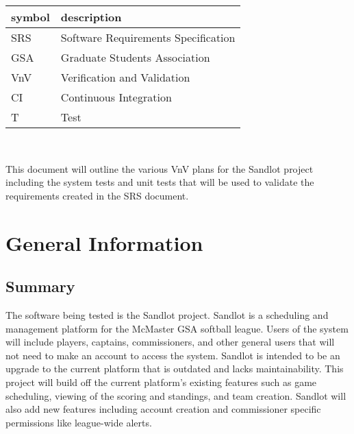 \documentclass[12pt, titlepage]{article}
\begin{document}
\renewcommand{\arraystretch}{1.2}
\begin{tabular}{l l} 
  \toprule		
  \textbf{symbol} & \textbf{description}\\
  \midrule 
  SRS & Software Requirements Specification\\
  GSA & Graduate Students Association\\
  VnV & Verification and Validation\\
  CI & Continuous Integration\\
  T & Test\\
  \bottomrule
\end{tabular}\\



\newpage


This document will outline the various VnV plans for the Sandlot project including
the system tests and unit tests that will be used to validate the requirements
created in the SRS document.


\section{General Information}

\subsection{Summary}


The software being tested is the Sandlot project. Sandlot is a scheduling and
management platform for the McMaster GSA softball league. Users of the system
will include players, captains, commissioners, and other general users that will
not need to make an account to access the system. Sandlot is intended to be an
upgrade to the current platform that is outdated and lacks maintainability. This
project will build off the current platform's existing features such as game
scheduling, viewing of the scoring and standings, and team creation. Sandlot will
also add new features including account creation and commissioner specific
permissions like league-wide alerts.
\end{document}
